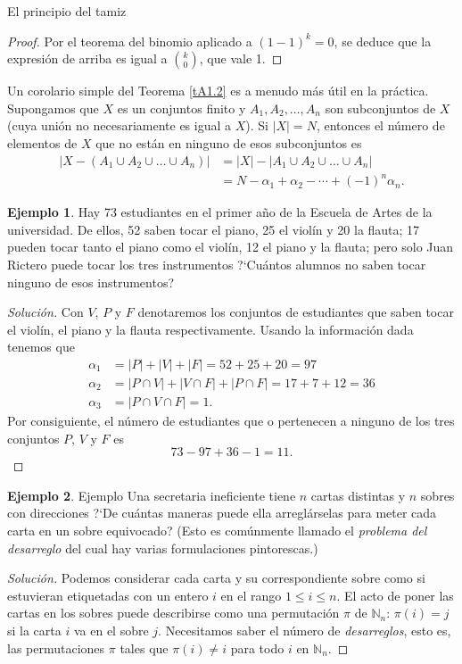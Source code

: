 \documentclass[11pt,spanish,makeidx]{amsbook}
\theoremstyle{definition}
\newtheorem{ejemplo}{Ejemplo}[section]
\theoremstyle{remark}
\begin{document}
\begin{section}{El principio del tamiz}
\begin{proof}
Por el teorema del binomio aplicado a $(1-1)^k=0$, se deduce que la expresión de arriba  es igual a
$\binom{k}{0}$, que vale 1.
\end{proof}

Un corolario simple del Teorema \ref{tA1.2} es a menudo más útil en la práctica. Supongamos que $X$ es un conjuntos finito y $A_1,A_2,\ldots,A_n$ son subconjuntos de $X$ (cuya unión no necesariamente es igual a $X$). Si $|X| = N$, entonces el número de elementos de $X$ que no están en ninguno de esos subconjuntos es
$$\begin{aligned}
|X-(A_1 \cup A_2 \cup \ldots \cup A_n)|&=
|X|-|A_1 \cup A_2 \cup \ldots \cup A_n| \\
&= N- \alpha_1 + \alpha_2 - \cdots + (-1)^n\alpha_n.
\end{aligned}
$$

\begin{ejemplo} Hay 73 estudiantes en el primer año de la Escuela de Artes de la universidad. De ellos, 52 saben tocar el piano, 25 el violín y 20 la flauta; 17 pueden tocar tanto el piano como el violín, 12 el piano y la flauta; pero solo Juan Rictero puede tocar los tres instrumentos ?`Cuántos alumnos no saben tocar ninguno de esos instrumentos?
\end{ejemplo}
\begin{proof}[Solución] Con $V$, $P$ y $F$ denotaremos los conjuntos de estudiantes que saben tocar el violín, el piano y la flauta
respectivamente. Usando la información dada tenemos que $$
\begin{aligned}
\alpha_1&= |P| + |V| + |F|= 52+25+20=97 \\
\alpha_2&= |P\cap V| + |V\cap F| + |P\cap F|=17+7+12=36 \\
\alpha_3&= |P\cap V\cap F|= 1.
\end{aligned}
$$
Por consiguiente, el número de estudiantes que o pertenecen a ninguno de los tres conjuntos $P$, $V$ y $F$ es
$$
73-97+36-1=11.
$$
\end{proof}

\begin{ejemplo} Ejemplo Una secretaria ineficiente tiene $n$ cartas distintas y $n$ sobres con direcciones ?`De cuántas maneras puede
ella arreglárselas para meter cada carta en un sobre equivocado? (Esto es comúnmente llamado el {\it problema del desarreglo} del
cual hay varias formulaciones pintorescas.) 
\end{ejemplo}
\begin{proof}[Solución] Podemos considerar cada carta y su correspondiente sobre  como si estuvieran etiquetadas con un entero $i$ en el rango $1 \le i \le n$. El acto de poner las cartas en los sobres puede describirse como una permutación $\pi$  de $\mathbb N_n$: $\pi(i)=j$ si la carta $i$ va en el sobre $j$. Necesitamos saber  el número de {\em desarreglos}, esto es, las permutaciones $\pi$ tales que
$\pi(i)\not=i$ para todo $i$ en $\mathbb N_n$.


\end{proof}
\end{section}
\end{document}
